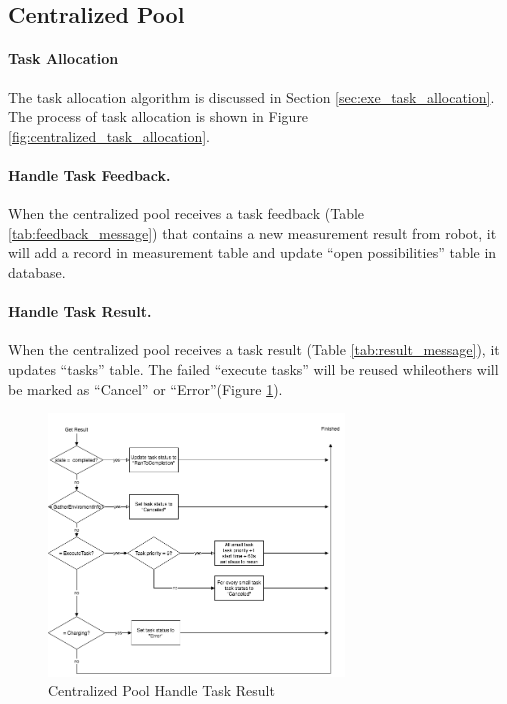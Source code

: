 \subsection{Centralized Pool}

\paragraph{Task Allocation}
The task allocation algorithm is discussed in Section \ref{sec:exe_task_allocation}. The process of task allocation is shown in Figure \ref{fig:centralized_task_allocation}. 

\paragraph{Handle Task Feedback.}
When the centralized pool receives a task feedback (Table \ref{tab:feedback_message}) that contains a new measurement result from robot, it will add a record in measurement table and update ``open possibilities'' table in database.

\paragraph{Handle Task Result.}
When the centralized pool receives a task result (Table \ref{tab:result_message}), it updates ``tasks'' table. The failed ``execute tasks'' will be reused whileothers will be marked as ``Cancel'' or ``Error''(Figure \ref{fig:centralized_task_handle}).

\begin{figure}[htbp]
    \centering
    \includegraphics[width = 0.7\textwidth]{content/images/ch4/centralized_task_result.drawio.png}
    \caption{Centralized Pool Handle Task Result}
    \label{fig:centralized_task_handle}
\end{figure}



